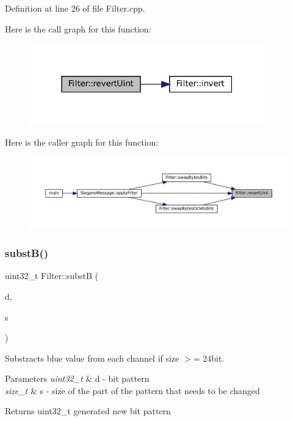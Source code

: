 Definition at line 26 of file Filter.\+cpp.

Here is the call graph for this function\+:\nopagebreak
\begin{figure}[H]
\begin{center}
\leavevmode
\includegraphics[width=289pt]{classFilter_ae4a4b081886014742d083d9a2b285981_cgraph}
\end{center}
\end{figure}
Here is the caller graph for this function\+:\nopagebreak
\begin{figure}[H]
\begin{center}
\leavevmode
\includegraphics[width=350pt]{classFilter_ae4a4b081886014742d083d9a2b285981_icgraph}
\end{center}
\end{figure}
\mbox{\label{classFilter_a3f2bbadc0138195cebf84bd8ce8d9892}} 
\subsubsection{\texorpdfstring{substB()}{substB()}}
{\footnotesize\ttfamily uint32\+\_\+t Filter\+::substB (\begin{DoxyParamCaption}\item[{uint32\+\_\+t}]{d,  }\item[{size\+\_\+t}]{s }\end{DoxyParamCaption})\hspace{0.3cm}{\ttfamily [static]}}



Substracts blue value from each channel if size $>$= 24bit. 


\begin{DoxyParams}{Parameters}
{\em uint32\+\_\+t} & d -\/ bit pattern \\
\hline
{\em size\+\_\+t} & s -\/ size of the part of the pattern that needs to be changed \\
\hline
\end{DoxyParams}
\begin{DoxyReturn}{Returns}
uint32\+\_\+t generated new bit pattern 
\end{DoxyReturn}



